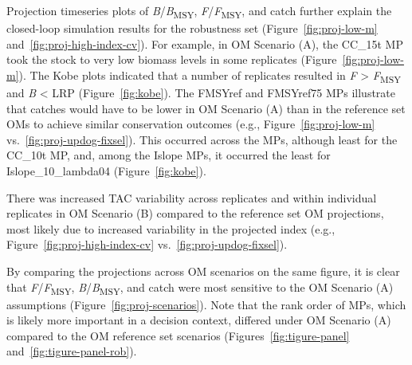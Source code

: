 \documentclass[11pt]{book}
\begin{document}
Projection timeseries plots of \emph{B}/\emph{B}\textsubscript{MSY}, \emph{F}/\emph{F}\textsubscript{MSY}, and catch further explain the closed-loop simulation results for the robustness set (Figure~\ref{fig:proj-low-m} and~\ref{fig:proj-high-index-cv}). For example, in OM Scenario (A), the CC\_15t MP took the stock to very low biomass levels in some replicates (Figure~\ref{fig:proj-low-m}). The Kobe plots indicated that a number of replicates resulted in \emph{F} \textgreater{} \emph{F}\textsubscript{MSY} and \emph{B} \textless{} LRP (Figure~\ref{fig:kobe}). The FMSYref and FMSYref75 MPs illustrate that catches would have to be lower in OM Scenario (A) than in the reference set OMs to achieve similar conservation outcomes (e.g., Figure~\ref{fig:proj-low-m} vs.~\ref{fig:proj-updog-fixsel}). This occurred across the MPs, although least for the CC\_10t MP, and, among the Islope MPs, it occurred the least for Islope\_10\_lambda04 (Figure~\ref{fig:kobe}).

There was increased TAC variability across replicates and within individual replicates in OM Scenario (B) compared to the reference set OM projections, most likely due to increased variability in the projected index (e.g., Figure~\ref{fig:proj-high-index-cv} vs.~\ref{fig:proj-updog-fixsel}).

By comparing the projections across OM scenarios on the same figure, it is clear that \emph{F}/\emph{F}\textsubscript{MSY}, \emph{B}/\emph{B}\textsubscript{MSY}, and catch were most sensitive to the OM Scenario (A) assumptions (Figure~\ref{fig:proj-scenarios}). Note that the rank order of MPs, which is likely more important in a decision context, differed under OM Scenario (A) compared to the OM reference set scenarios (Figures~\ref{fig:tigure-panel} and~\ref{fig:tigure-panel-rob}).
\end{document}
